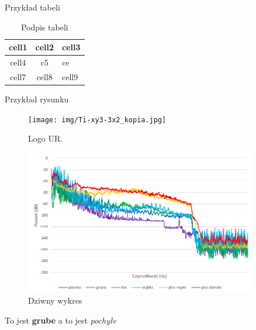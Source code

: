 {Przykład tabeli
\begin{table}
\label{tab:numer}
\begin{center}
\begin{tabular}{ |c |c| l| }
\hline
 cell1 & cell2 & cell3 \\ 
 \hline\hline
 cell4 & c5 & ce \\ 
 \hline
 cell7 & cell8 & cell9  \\ 
 \hline
\end{tabular}
\end{center}
\caption{Podpis tabeli}
\end{table}

Przykład rysunku
\begin{figure}%
	\centering \texttt{[image: img/Ti-xy3-3x2\_kopia.jpg]}
	\caption{Logo UR.}
\label{figure_1a}
\end{figure}

\begin{figure}%
	\centering 
	\includegraphics[trim= 0 0 150 150, clip, angle=45, width=0.9\textwidth]{wykres.png}
	\caption{Dziwny wykres}
\label{figure_1b}
\end{figure}

To jest {\textbf{grube}} a to jest \textit{pochyłe}


}